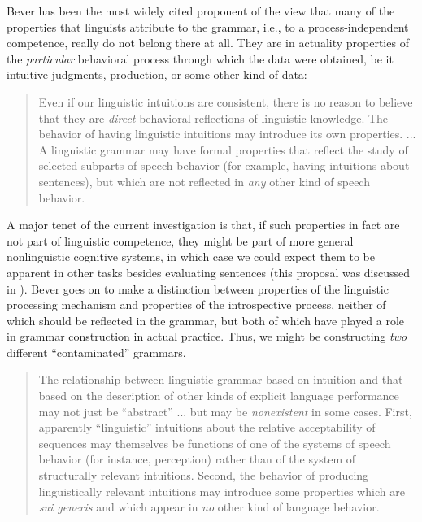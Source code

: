 Bever has been the most widely cited proponent of the view that many of the properties that linguists attribute to the grammar, i.e., to a process-independent competence, really do not belong there at all. They are in actuality properties of the \textit{particular} behavioral process through which the data were obtained, be it intuitive judgments, production, or some other kind of data:

\begin{quote}
Even if our linguistic intuitions are consistent, there is no reason to believe that they are \textit{direct} behavioral reflections of linguistic knowledge. The behavior of having linguistic intuitions may introduce its own properties. ... A linguistic grammar may have formal properties that reflect the study of selected subparts of speech behavior (for example, having intuitions about sentences), but which are not reflected in \textit{any} other kind of speech behavior. \citep[343\textendash{}344]{Bever1970a}
\end{quote}

\noindent
A major tenet of the current investigation is that, if such properties in fact are not part of linguistic competence, they might be part of more general nonlinguistic cognitive systems, in which case we could expect them to be apparent in other tasks besides evaluating sentences (this proposal was discussed in ). Bever goes on to make a distinction between properties of the linguistic processing mechanism and properties of the introspective process, neither of which should be reflected in the grammar, but both of which have played a role in grammar
construction in actual practice. Thus, we might be constructing \textit{two} different ``contaminated''  grammars.

\begin{quote}
The relationship between linguistic grammar based on intuition and that based on the description of other kinds of explicit language performance may not just be ``abstract'' ... but may be \textit{nonexistent} in some cases. First, apparently ``linguistic'' intuitions about the relative acceptability of sequences may themselves be functions of one of the systems of speech behavior (for instance, perception) rather than of the system of structurally relevant intuitions. Second, the behavior of producing linguistically relevant intuitions may introduce some properties which are \textit{sui generis} and which appear in \textit{no} other kind of language behavior. \citep[345]{Bever1970a}
\end{quote}

